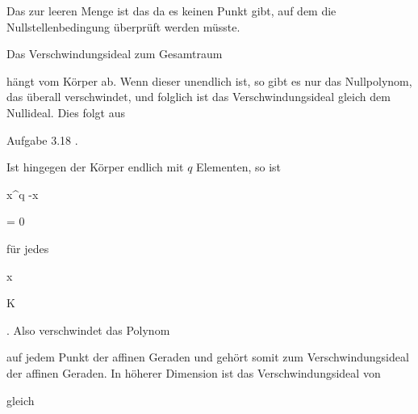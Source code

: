 {


Das
zur leeren Menge ist das
da es keinen Punkt gibt, auf dem die Nullstellenbedingung überprüft werden müsste.


Das Verschwindungsideal zum Gesamtraum


 hängt vom Körper ab. Wenn dieser unendlich ist, so gibt es nur das Nullpolynom, das überall verschwindet, und folglich ist das Verschwindungsideal gleich dem Nullideal. Dies folgt aus

Aufgabe 3.18
.


Ist hingegen der Körper endlich mit $q$ Elementen, so ist


\mavergleichskette


{\vergleichskette


{ x^q -x
}


{ = }{ 0
}


{  }{
}


{    }{
}


{   }{
}


}
{}{}{}
für jedes


\mavergleichskette


{\vergleichskette


{ x
}


{ \in }{ K
}


{  }{
}


{    }{
}


{   }{
}


}
{}{}{.}
Also verschwindet das Polynom


 auf jedem Punkt der affinen Geraden und gehört somit zum Verschwindungsideal der affinen Geraden. In höherer Dimension ist das Verschwindungsideal von


   gleich




}




